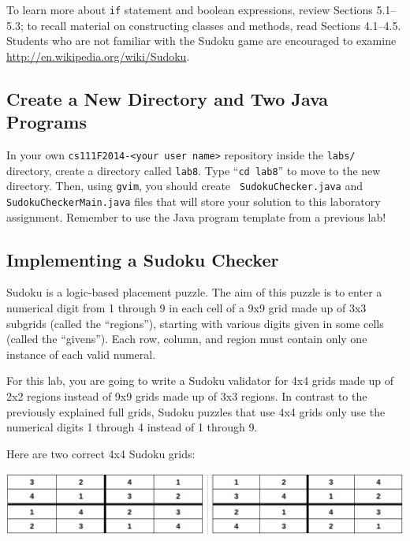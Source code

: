 To learn more about {\tt if} statement and boolean expressions, review Sections 5.1--5.3; to recall material on
constructing classes and methods, read Sections 4.1--4.5.  Students who are not familiar with the Sudoku game are
encouraged to examine \url{http://en.wikipedia.org/wiki/Sudoku}.

\vspace{-0.1in}
\subsection*{Create a New Directory and Two Java Programs}
\vspace{-0.05in}

In your own {\tt cs111F2014-<your user name>} repository inside the {\tt labs/} directory, create a directory called
{\tt lab8}. Type ``{\tt cd lab8}'' to move to the new directory. Then, using {\tt gvim}, you should create {\tt
  SudokuChecker.java} and {\tt SudokuCheckerMain.java} files that will store your solution to this laboratory
assignment. Remember to use the Java program template from a previous lab!

\vspace{-0.1in}
\subsection*{Implementing a Sudoku Checker}
\vspace{-0.05in}

Sudoku is a logic-based placement puzzle. The aim of this puzzle is to enter a numerical digit from 1 through 9 in each
cell of a 9x9 grid made up of 3x3 subgrids (called the ``regions''), starting with various digits given in some cells
(called the ``givens''). Each row, column, and region must contain only one instance of each valid numeral.

\noindent For this lab, you are going to write a Sudoku validator for 4x4 grids made up of 2x2 regions instead of 9x9
grids made up of 3x3 regions.  In contrast to the previously explained full grids, Sudoku puzzles that use 4x4 grids
only use the numerical digits 1 through 4 instead of 1 through 9.

\noindent Here are two correct 4x4 Sudoku grids:

\vspace*{.01in}
\includegraphics[scale=0.3]{grids}

